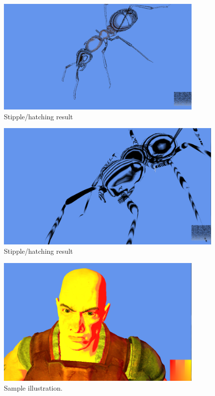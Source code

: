 \documentclass[annual]{acmsiggraph}
\begin{document}
\begin{figure}[h]
	\centering
	\includegraphics[width=4in]{images/stipple-hatch-result1}
	\caption{Stipple/hatching result}
	\label{fig:stippleHatch1}
\end{figure}

\begin{figure}[h]
	\centering
	\includegraphics[width=6in]{images/stipple-hatch-result2}
	\caption{Stipple/hatching result}
	\label{fig:stippleHatch2}
\end{figure}

\begin{figure}[h]
  \centering
  \includegraphics[width=4in]{images/test}
  \caption{Sample illustration.}
\end{figure}
\end{document}
